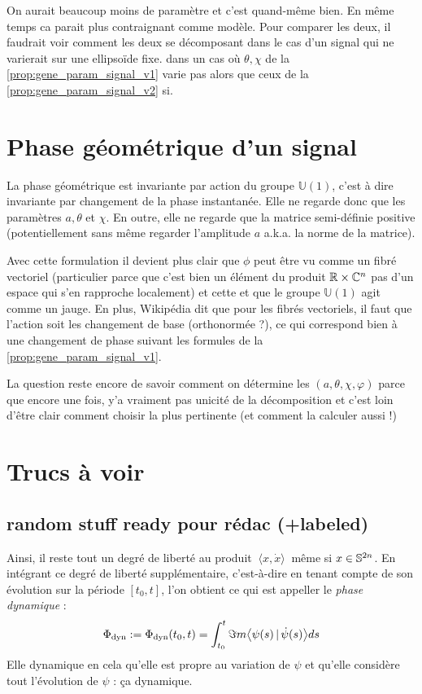 On aurait beaucoup moins de paramètre et c'est quand-même bien. En même temps ca parait plus contraignant comme modèle. Pour comparer les deux, il faudrait voir comment les deux se décomposant dans le cas d'un signal qui ne varierait sur une ellipsoïde fixe. \ie dans un cas où $\theta,\chi$ de la \cref{prop:gene_param_signal_v1} varie pas alors que ceux de la \cref{prop:gene_param_signal_v2} si.




\setcounter{figure}{0}
\setcounter{lstlisting}{0}

\section{Phase géométrique d'un signal}\label{sec:phasegeo}

La phase géométrique est invariante par action du groupe $\mathbb{U}(1)$, c'est à dire invariante par changement de la phase instantanée. Elle ne regarde donc que les paramètres $a, \theta$ et $\chi$. En outre, elle ne regarde que la matrice semi-définie positive (potentiellement sans même regarder l'amplitude $a$ a.k.a. la norme de la matrice).

Avec cette formulation il devient plus clair que $\phi$ peut être vu comme un fibré vectoriel (particulier parce que c'est bien un élément du produit $\R\times\C^n$ pas d'un espace qui s'en rapproche localement) et cette et que le groupe $\mathbb{U}(1)$ agit comme un jauge. En plus, Wikipédia dit que pour les fibrés vectoriels, il faut que l'action soit les changement de base (orthonormée ?), ce qui correspond bien à une changement de phase suivant les formules de la \cref{prop:gene_param_signal_v1}.

La question reste encore de savoir comment on détermine les $(a,\theta,\chi,\varphi)$ parce que encore une fois, y'a vraiment pas unicité de la décomposition et c'est loin d'être clair comment choisir la plus pertinente (et comment la calculer aussi !)



\section{Trucs à voir}


\subsection{random  stuff ready pour rédac (+labeled)}
\begin{definition}\label{def:phase_dyn}
	Ainsi, il reste tout un degré de liberté au produit $\ \langle x, \dot{x} \rangle\ $ même si $x\in\S^{2n}$. En intégrant ce degré de liberté supplémentaire, c'est-à-dire en tenant compte de son évolution sur la période $[t_0,t]$, l'on obtient ce qui est appeller le \emph{phase dynamique} :
	\[\phased \defeq \phased(t_0,t) = \int_{t_0}^t \Im m \big\langle \psi(s) \, |\, \dot{\psi}(s) \big\rangle ds\]
	Elle dynamique en cela qu'elle est propre au variation de $\psi$ et qu'elle considère tout l'évolution de $\psi$ : ça dynamique.
\end{definition}


